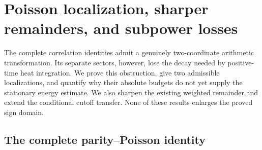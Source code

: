 \documentclass[11pt]{article}
\numberwithin{equation}{section}
\theoremstyle{definition}
\theoremstyle{remark}
\begin{document}
\section{Poisson localization, sharper remainders, and subpower losses}
\label{upd:section}

The complete correlation identities admit a genuinely two-coordinate
arithmetic transformation.  Its separate sectors, however, lose the
decay needed by positive-time heat integration.  We prove this obstruction,
give two admissible localizations, and quantify why their absolute budgets
do not yet supply the stationary energy estimate.  We also sharpen the
existing weighted remainder and extend the conditional cutoff transfer.
None of these results enlarges the proved sign domain.

\subsection{The complete parity--Poisson identity}
\end{document}
